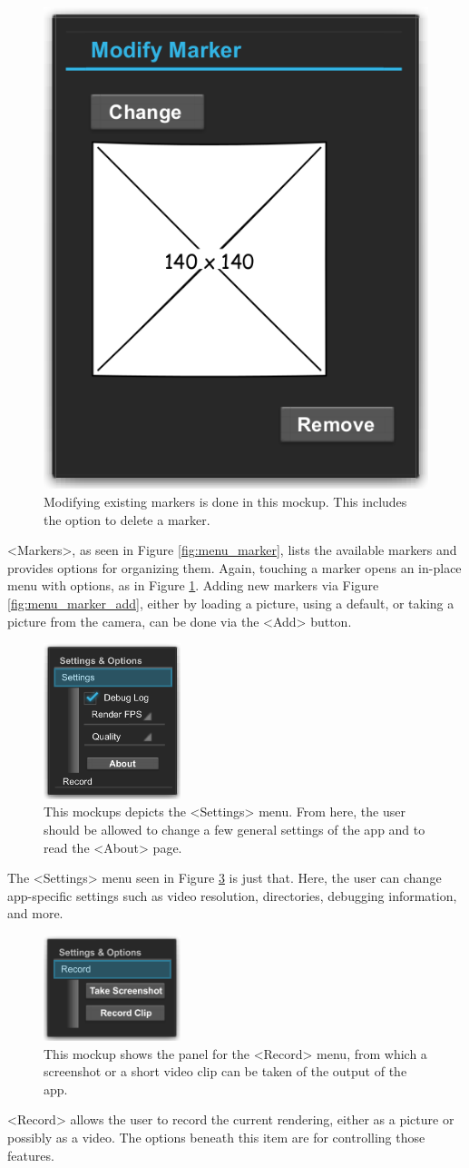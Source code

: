 \begin{figure}[H]
		\centering
		\includegraphics[width=0.25\linewidth]{img/menu_marker_modify.png}
		\caption[Modify Marker Menu Mockup.]{Modifying existing markers is done in this mockup. This includes the option to delete a marker.}
		\label{fig:menu_marker_modify}
	\endminipage\hfill
\end{figure}

<Markers>, as seen in Figure \ref{fig:menu_marker}, lists the available markers and provides options for organizing them.
Again, touching a marker opens an in-place menu with options, as in Figure \ref{fig:menu_marker_modify}.
Adding new markers via Figure \ref{fig:menu_marker_add}, either by loading a picture, using a default, or taking a picture from the camera, can be done via the <Add> button.

\begin{figure}[H]
	\centering
	\includegraphics[width=4cm]{img/menu_settings.png}
	\caption[Settings Menu Mockup.]{This mockups depicts the <Settings> menu. From here, the user should be allowed to change a few general settings of the app and to read the <About> page.}
	\label{fig:menu_settings}
\end{figure}

The <Settings> menu seen in Figure \ref{fig:menu_settings} is just that.
Here, the user can change app-specific settings such as video resolution, directories, debugging information, and more.

\begin{figure}[H]
	\centering
	\includegraphics[width=4cm]{img/menu_record.png}
	\caption[Record Menu Mockup.]{This mockup shows the panel for the <Record> menu, from which a screenshot or a short video clip can be taken of the output of the app.}
	\label{fig:menu_settings}
\end{figure}

<Record> allows the user to record the current rendering, either as a picture or possibly as a video.
The options beneath this item are for controlling those features.
